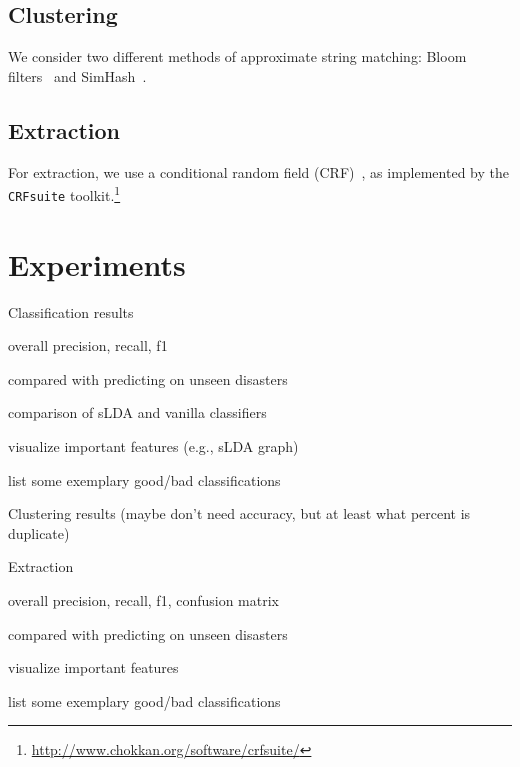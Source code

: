 \documentclass{article}
\begin{document}
\subsection{Clustering}
We consider two different methods of approximate string matching: Bloom
filters~\cite{bloom70space} and SimHash~\cite{charikar02similarity}.


\subsection{Extraction}
For extraction, we use a conditional random field (CRF)~\cite{sutton12intro}, as
implemented by the {\tt CRFsuite}
toolkit.\footnote{\url{http://www.chokkan.org/software/crfsuite/}}


\section{Experiments}
\begin{outline}
  \item Classification results
    \begin{outline}
      \item overall precision, recall, f1
      \item compared with predicting on unseen disasters
      \item comparison of sLDA and vanilla classifiers
      \item visualize important features (e.g., sLDA graph)
      \item list some exemplary good/bad classifications
    \end{outline}
  \item Clustering results (maybe don't need accuracy, but at least what percent is duplicate)
  \item Extraction
    \begin{outline}
      \item overall precision, recall, f1, confusion matrix
      \item compared with predicting on unseen disasters
      \item visualize important features
      \item list some exemplary good/bad classifications
    \end{outline}
\end{outline}
\end{document}
